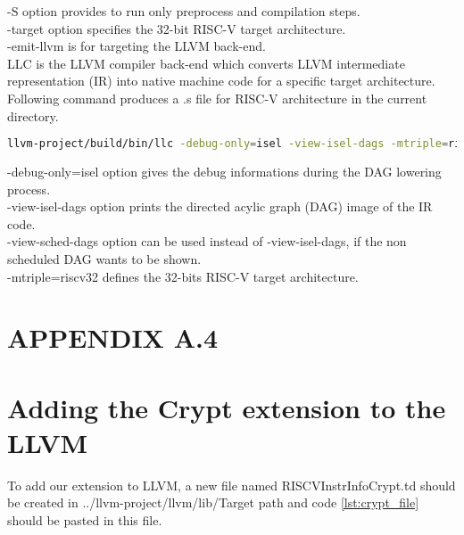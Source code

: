 -S option provides to run only preprocess and compilation steps. \\
-target option specifies the 32-bit RISC-V target architecture. \\
-emit-llvm is for targeting the LLVM back-end. \\

LLC is the LLVM compiler back-end which converts LLVM intermediate representation (IR) into native machine code for a specific target architecture. Following command produces a .s file for RISC-V architecture in the current directory. 

\begin{lstlisting}[language=Bash]
llvm-project/build/bin/llc -debug-only=isel -view-isel-dags -mtriple=riscv32 lxr.ll
\end{lstlisting}

-debug-only=isel option gives the debug informations during the DAG lowering process.\\
-view-isel-dags option prints the directed acylic graph (DAG) image of the IR code.\\
-view-sched-dags option can be used instead of -view-isel-dags, if the non scheduled DAG wants to be shown.\\
-mtriple=riscv32 defines the 32-bits RISC-V target architecture.\\
\newpage



\section*{APPENDIX A.4}
\renewcommand{\theequation}{A.2.\arabic{equation}}
\setcounter{equation}{0}
\section{Adding the Crypt extension to the LLVM}
To add our extension to LLVM, a new file named RISCVInstrInfoCrypt.td should be created in ../llvm-project/llvm/lib/Target path and code \ref{lst:crypt_file} should be pasted in this file.

